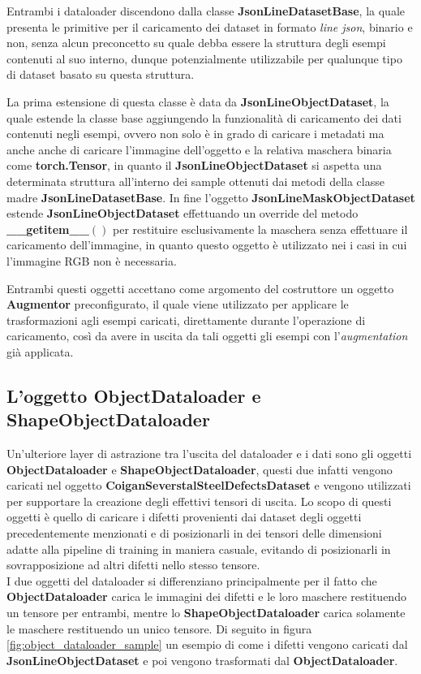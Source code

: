 Entrambi i dataloader discendono dalla classe \textbf{JsonLineDatasetBase}, la quale presenta le primitive per il caricamento dei dataset in formato \textit{line json},
binario e non, senza alcun preconcetto su quale debba essere la struttura degli esempi contenuti al suo interno, dunque potenzialmente utilizzabile per qualunque tipo di dataset
basato su questa struttura.

La prima estensione di questa classe è data da \textbf{JsonLineObjectDataset}, la quale estende la classe base aggiungendo la funzionalità di caricamento
dei dati contenuti negli esempi, ovvero non solo è in grado di caricare i metadati ma anche anche di caricare l'immagine dell'oggetto e la relativa maschera binaria come \textbf{torch.Tensor},
in quanto il \textbf{JsonLineObjectDataset} si aspetta una determinata struttura all'interno dei sample ottenuti dai metodi della classe madre \textbf{JsonLineDatasetBase}.
In fine l'oggetto \textbf{JsonLineMaskObjectDataset} estende \textbf{JsonLineObjectDataset} effettuando un override del metodo \textbf{\_\_getitem\_\_$()$} per restituire esclusivamente la maschera
senza effettuare il caricamento dell'immagine, in quanto questo oggetto è utilizzato nei i casi in cui l'immagine RGB non è necessaria.

Entrambi questi oggetti accettano come argomento del costruttore un oggetto \textbf{Augmentor} preconfigurato, il quale viene utilizzato per applicare le trasformazioni
agli esempi caricati, direttamente durante l'operazione di caricamento, così da avere in uscita da tali oggetti gli esempi con l'\textit{augmentation} già applicata.



\subsection{L'oggetto ObjectDataloader e ShapeObjectDataloader}
Un'ulteriore layer di astrazione tra l'uscita del dataloader e i dati sono gli oggetti \textbf{ObjectDataloader} e \textbf{ShapeObjectDataloader}, questi due infatti
vengono caricati nel oggetto \textbf{CoiganSeverstalSteelDefectsDataset} e vengono utilizzati per supportare la creazione degli effettivi tensori di uscita.
Lo scopo di questi oggetti è quello di caricare i difetti provenienti dai dataset degli oggetti precedentemente menzionati e di posizionarli in dei tensori delle dimensioni adatte alla pipeline di training
in maniera casuale, evitando di posizionarli in sovrapposizione ad altri difetti nello stesso tensore.\\
I due oggetti del dataloader si differenziano principalmente per il fatto che \textbf{ObjectDataloader} carica le immagini dei difetti e le loro maschere restituendo un tensore per entrambi, mentre lo 
\textbf{ShapeObjectDataloader} carica solamente le maschere restituendo un unico tensore.
Di seguito in figura \ref{fig:object_dataloader_sample} un esempio di come i difetti vengono caricati dal \textbf{JsonLineObjectDataset} e poi vengono trasformati dal \textbf{ObjectDataloader}.

